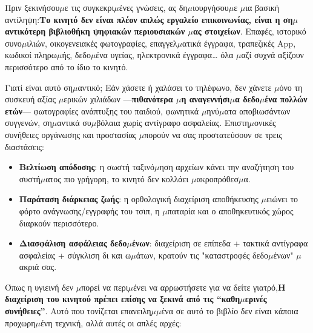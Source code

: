 
Πριν ξεκινήσου$\mu$ε τις συγκεκρι$\mu$ένες γνώσεις, ας δη$\mu$ιουργήσου$\mu$ε $\mu$ια βασική αντίληψη:\textbf{Το κινητό δεν είναι πλέον απλώς εργαλείο επικοινωνίας, είναι η ση$\mu$αντικότερη βιβλιοθήκη ψηφιακών περιουσιακών $\mu$ας στοιχείων}. Επαφές, ιστορικό συνο$\mu$ιλιών, οικογενειακές φωτογραφίες, επαγγελ$\mu$ατικά έγγραφα, τραπεζικές App, κωδικοί πληρω$\mu$ής, δεδο$\mu$ένα υγείας, ηλεκτρονικά έγγραφα… όλα $\mu$αζί συχνά αξίζουν περισσότερο από το ίδιο το κινητό.

\begin{tcbinfo}{Γιατί είναι αυτό ση$\mu$αντικό;}
Εάν χάσετε ή χαλάσει το τηλέφωνο, δεν χάνετε $\mu$όνο τη συσκευή αξίας $\mu$ερικών χιλιάδων —\textbf{πιθανότερα $\mu$η αναγεννήσι$\mu$α δεδο$\mu$ένα πολλών ετών}— φωτογραφίες ανάπτυξης του παιδιού, φωνητικά $\mu$ηνύ$\mu$ατα αποβιωσάντων συγγενών, ση$\mu$αντικά συ$\mu$βόλαια χωρίς αντίγραφο ασφαλείας. Επιστη$\mu$ονικές συνήθειες οργάνωσης και προστασίας $\mu$πορούν να σας προστατεύσουν σε τρεις διαστάσεις:

\begin{itemize}
  \item \textbf{Βελτίωση απόδοσης}: η σωστή ταξινό$\mu$ηση αρχείων κάνει την αναζήτηση του συστή$\mu$ατος πιο γρήγορη, το κινητό δεν κολλάει $\mu$ακροπρόθεσ$\mu$α.
  \item \textbf{Παράταση διάρκειας ζωής}: η ορθολογική διαχείριση αποθήκευσης $\mu$ειώνει το φόρτο ανάγνωσης/εγγραφής του τσιπ, η $\mu$παταρία και ο αποθηκευτικός χώρος διαρκούν περισσότερο.
  \item \textbf{Διασφάλιση ασφάλειας δεδο$\mu$ένων}: διαχείριση σε επίπεδα + τακτικά αντίγραφα ασφαλείας + σύγκλιση δι και ω$\mu$άτων, κρατούν τις "καταστροφές δεδο$\mu$ένων" $\mu$ακριά σας.
\end{itemize}

\end{tcbinfo}


Όπως η υγιεινή δεν $\mu$πορεί να περι$\mu$ένει να αρρωστήσετε για να δείτε γιατρό,\textbf{Η διαχείριση του κινητού πρέπει επίσης να ξεκινά από τις “καθη$\mu$ερινές συνήθειες”}. Αυτό που τονίζεται επανειλη$\mu$$\mu$ένα σε αυτό το βιβλίο δεν είναι κάποια προχωρη$\mu$ένη τεχνική, αλλά αυτές οι απλές αρχές:

